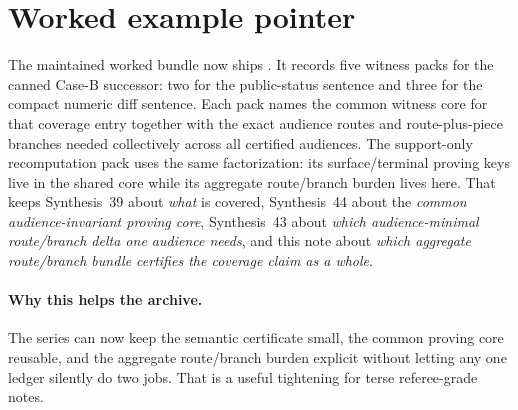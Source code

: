 \documentclass[11pt]{article}
\begin{document}
\section{Worked example pointer}
The maintained worked bundle now ships .\cite{series:workedexample}
It records five witness packs for the canned Case-B successor: two for the public-status sentence and three for the compact numeric diff sentence.
Each pack names the common witness core for that coverage entry together with the exact audience routes and route-plus-piece branches needed collectively across all certified audiences.
The support-only recomputation pack uses the same factorization: its surface/terminal proving keys live in the shared core while its aggregate route/branch burden lives here.
That keeps Synthesis~39 about \emph{what} is covered, Synthesis~44 about the \emph{common audience-invariant proving core}, Synthesis~43 about \emph{which audience-minimal route/branch delta one audience needs}, and this note about \emph{which aggregate route/branch bundle certifies the coverage claim as a whole}.\cite{series:challengecoverage,series:challengecoveragewitnesscores,series:challengecoveragewitnessslices}

\paragraph{Why this helps the archive.}
The series can now keep the semantic certificate small, the common proving core reusable, and the aggregate route/branch burden explicit without letting any one ledger silently do two jobs.
That is a useful tightening for terse referee-grade notes.
\end{document}
